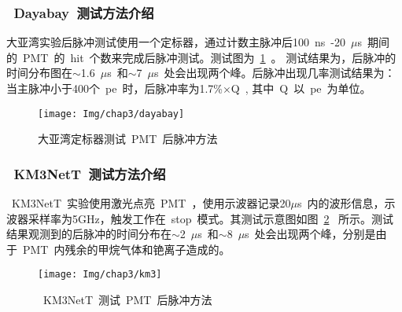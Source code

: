 \subsubsection{~Dayabay~测试方法介绍}
大亚湾实验后脉冲测试使用一个定标器，通过计数主脉冲后100~ns~-20~$\mu$s~期间的~PMT~的~hit~个数来完成后脉冲测试。测试图为~\ref{fig:dayabay}~。 测试结果为，后脉冲的时间分布图在$\sim$1.6~$\mu$s~和$\sim$7~$\mu$s~处会出现两个峰。后脉冲出现几率测试结果为：当主脉冲小于400个~pe~时，后脉冲率为1.7\%$\times$Q~, 其中~Q~以~pe~为单位。
\begin{figure}[!htb]
  \centering
   \texttt{[image: Img/chap3/dayabay]}
    \caption{大亚湾定标器测试~PMT~后脉冲方法}
  \label{fig:dayabay}
\end{figure}
\subsubsection{~KM3NetT~测试方法介绍}
~KM3NetT~实验使用激光点亮~PMT~，使用示波器记录20$\mu$s~内的波形信息，示波器采样率为5GHz，触发工作在~stop~模式。其测试示意图如图~\ref{fig:km3}~ 所示。测试结果观测到的后脉冲的时间分布在$\sim$2~$\mu$s~和$\sim$8~$\mu$s~处会出现两个峰，分别是由于~PMT~内残余的甲烷气体和铯离子造成的。
\begin{figure}[!htb]
  \centering
   \texttt{[image: Img/chap3/km3]}
    \caption{~KM3NetT~测试~PMT~后脉冲方法}
  \label{fig:km3}
\end{figure}


